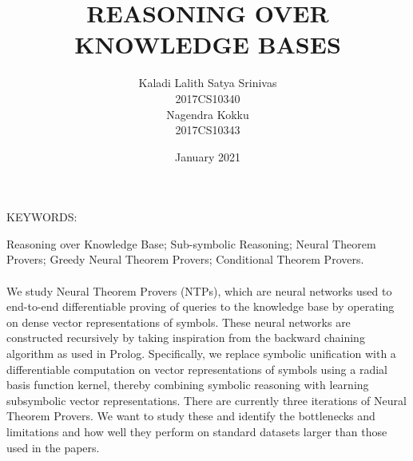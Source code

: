 \documentclass[Other]{iitddiss}
\begin{document}

\title{REASONING OVER KNOWLEDGE BASES}

\author{Kaladi Lalith Satya Srinivas \\2017CS10340\\ Nagendra Kokku \\2017CS10343}
\date{January 2021}

\maketitle



\abstract

\noindent KEYWORDS: \hspace*{0.5em} \parbox[t]{4.4in}{Reasoning over Knowledge Base; Sub-symbolic Reasoning; Neural Theorem Provers; Greedy Neural Theorem Provers; Conditional Theorem Provers.}

\paragraph{}
We study Neural Theorem Provers (NTPs), which are neural networks used to end-to-end differentiable proving of queries to the knowledge base by operating on dense vector representations of symbols. These neural networks are constructed recursively by taking inspiration from the backward chaining algorithm as used in Prolog. Specifically, we replace symbolic unification with a differentiable computation on vector representations of symbols using a radial basis function kernel, thereby combining symbolic reasoning with learning subsymbolic vector representations. There are currently three iterations of Neural Theorem Provers. We want to study these and identify the bottlenecks and limitations and how well they perform on standard datasets larger than those used in the papers.

\vspace*{24pt}

\noindent 

\pagebreak


\begin{singlespace}
\tableofcontents
\thispagestyle{empty}
\end{singlespace}
\end{document}

